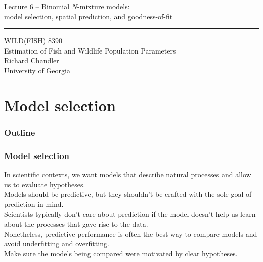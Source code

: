 \documentclass[color=usenames,dvipsnames]{beamer}\usepackage[]{graphicx}\usepackage[]{color}
\begin{document}
\begin{frame}[plain]
  \LARGE
  \centering
  {\LARGE Lecture 6 -- Binomial $N$-mixture models: \\
    model selection, spatial prediction, and goodness-of-fit} \\  
  {\color{default} \rule{\textwidth}{0.1pt}}
  \vfill
  \large
  WILD(FISH) 8390 \\
  Estimation of Fish and Wildlife Population Parameters \\
  \vfill
  \large
  Richard Chandler \\
  University of Georgia \\
\end{frame}





\section{Model selection}



\begin{frame}[plain]
  \frametitle{Outline}
  \Large
\end{frame}





\begin{frame}
  \frametitle{Model selection}
  In scientific contexts, we want models that describe natural
  processes and allow us to evaluate hypotheses. \\
  \pause
  \vfill
  Models should be predictive, but they shouldn't be crafted with the
  sole goal of prediction in mind. \\
  \pause
  \vfill
  Scientists typically don't care about prediction if the model
  doesn't help us learn about the processes that gave rise to the
  data. \\  
  \pause
  \vfill
  Nonetheless, predictive performance is often the best way
  to compare models and avoid underfitting and overfitting. \\
  \pause
  \vfill
  Make sure the models being compared were motivated by clear
  hypotheses.
\end{frame}
\end{document}
